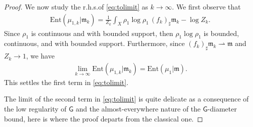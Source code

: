 \documentclass[11pt,a4paper]{article}
\theoremstyle{plain}
\theoremstyle{definition}
\theoremstyle{remark}
\numberwithin{equation}{section}
\newcommand{\N}{\mathbb{N}} %
\newcommand{\blue}{\color{blue}}
\DeclareMathOperator{\supp}{\mathrm{supp}}
\newcommand{\Ent}{\mathrm{Ent}}
\newcommand{\di}{\mathrm{d}}
\newcommand{\mm}{\mathfrak m}
\newcommand{\sfG}{\mathsf G}
\begin{document}
\begin{proof}

We now study the r.h.s.\@ of \eqref{eq:tolimit} as $k\to \infty$. We first observe that
\begin{align}
\Ent(\mu_{1,k}|\mm_k) =\frac{1}{Z_k} \int_{X} \rho_1\log\rho_1\, (f_k)_\sharp \mm_k  - \log Z_k.
\end{align}
Since $\rho_1$ is continuous and with bounded support, then $\rho_1\log\rho_1$ is bounded, continuous, and with bounded support. Furthermore, since $(f_k)_\sharp \mm_k \rightharpoonup \mm$ and $Z_k\to 1$, we have
\begin{align}
\lim_{k\to\infty} \Ent(\mu_{1,k}|\mm_k)  = \Ent(\mu_{1}|\mm).
\end{align}
This settles the first term in \eqref{eq:tolimit}. 

The limit of the second term in \eqref{eq:tolimit} is quite delicate as a consequence of the low regularity of $\sfG$ and the almost-everywhere nature of the $\sfG$-diameter bound,  here is where the proof departs from the classical one. 


\end{proof}
\end{document}
